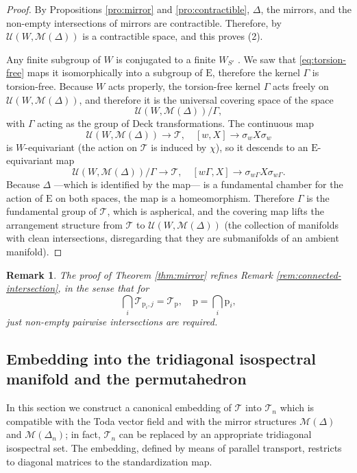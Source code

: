 \documentclass[reqno]{amsart}
\newcommand{\p}{\mathrm{p}}
\newcommand{\cM}{\mathcal{M}}
\newcommand{\cT}{\mathcal{T}}
\newcommand{\cU}{\mathcal{U}}
\newtheorem{remark}[theorem]{Remark}
\begin{document}
\begin{proof}
By Propositions \ref{pro:mirror} and \ref{pro:contractible}, $\Delta$, the mirrors, and the non-empty  intersections of mirrors are contractible. Therefore,
by   \cite[Theorem 13.5]{Da1} $\cU(W,\cM(\Delta))$ is a contractible space, and this proves (2).

Any finite subgroup of $W$ is conjugated to a finite $W_{S'}$ \cite[Lemma 1.3]{Da2}. We saw that \eqref{eq:torsion-free} maps it isomorphically into a subgroup of $\mathrm{E}$, therefore the kernel $\Gamma$  is torsion-free.
Because $W$ acts properly, the torsion-free kernel $\Gamma$ acts freely on $\cU(W,\cM(\Delta))$, and therefore it is the universal covering space of the space
\[\cU(W,\cM(\Delta))/\Gamma,\]
with $\Gamma$ acting as the group of Deck transformations.
The continuous map
\[\cU(W,\cM(\Delta))\to \cT,\quad [w,X]\to \sigma_w X\sigma_w \]
is $W$-equivariant (the action on $\cT$ is induced by $\chi$), so it descends to an   $\mathrm{E}$-equivariant map
\[\cU(W,\cM(\Delta))/\Gamma\to \cT,\quad [w\Gamma,X]\to \sigma_{w\Gamma}X\sigma_{w\Gamma}.\]
Because $\Delta$  ---which is identified by the map--- is a fundamental chamber for the action of $\mathrm{E}$ on both spaces, the map is a homeomorphism. Therefore $\Gamma$ is the fundamental group of $\cT$, which is aspherical, and the covering map lifts the arrangement structure  from $\cT$ to
$\cU(W,\cM(\Delta))$ (the collection of manifolds with clean intersections, disregarding that they are submanifolds of an ambient manifold).
\end{proof}
\begin{remark}\label{rem:connected-intersection-2}
The proof of Theorem \ref{thm:mirror} refines Remark \ref{rem:connected-intersection}, in the sense that for
\[\bigcap_i\cT_{\p_i,j}=\cT_\p,\quad \p=\bigcap_i\p_i,\]
just non-empty pairwise intersections are required.
\end{remark}
\subsection{Embedding into  the tridiagonal isospectral manifold and the permutahedron}\label{ssec:embedding}
In this section we construct a canonical embedding of $\cT$ into $\cT_{n}$ which is compatible with the Toda vector field and with the mirror structures $\cM(\Delta)$ and $\cM(\Delta_{n})$; in fact, $\cT_{n}$ can be replaced by an appropriate tridiagonal isospectral set. The embedding, defined by means of parallel transport, restricts to diagonal matrices to the standardization map.
\end{document}
